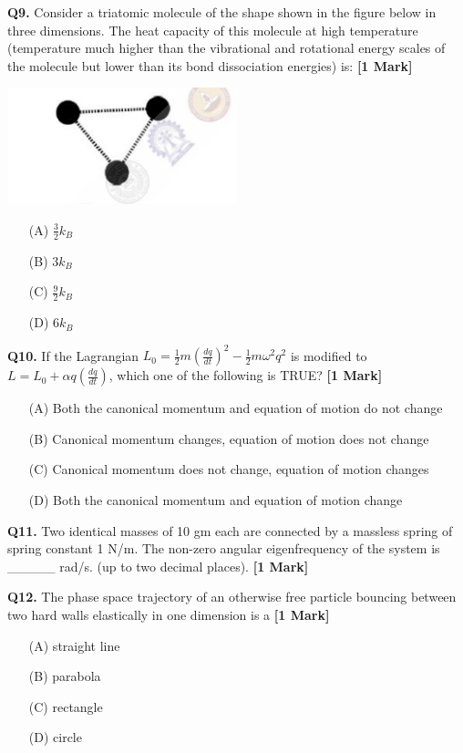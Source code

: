 \documentclass[11pt]{article}
\newcommand{\questiona}[2]{
    \noindent\textbf{Q#2.} #1 \hfill \textbf{[1 Mark]}
}
\begin{document}
\questiona{Consider a triatomic molecule of the shape shown in the figure below in three dimensions. The heat capacity of this molecule at high temperature (temperature much higher than the vibrational and rotational energy scales of the molecule but lower than its bond dissociation energies) is:}{9}
\begin{center}
\includegraphics[width=0.5\textwidth]{figures/9.png}
\end{center}
\begin{enumerate}
    \item[(A)] \(\frac{3}{2} k_B\)
    \item[(B)] \(3 k_B\)
    \item[(C)] \(\frac{9}{2} k_B\)
    \item[(D)] \(6 k_B\)
\end{enumerate}
\vspace{0.5cm}

\questiona{If the Lagrangian \( L_0 = \frac{1}{2} m \left( \frac{dq}{dt} \right)^2 - \frac{1}{2} m \omega^2 q^2 \) is modified to \( L = L_0 + \alpha q \left( \frac{dq}{dt} \right) \), which one of the following is TRUE?}{10}
\begin{enumerate}
    \item[(A)] Both the canonical momentum and equation of motion do not change
    \item[(B)] Canonical momentum changes, equation of motion does not change
    \item[(C)] Canonical momentum does not change, equation of motion changes
    \item[(D)] Both the canonical momentum and equation of motion change
\end{enumerate}
\vspace{0.5cm}

\questiona{Two identical masses of 10 gm each are connected by a massless spring of spring constant 1 N/m. The non-zero angular eigenfrequency of the system is \_\_\_\_\_ rad/s. (up to two decimal places).}{11}
\vspace{0.5cm}

\questiona{The phase space trajectory of an otherwise free particle bouncing between two hard walls elastically in one dimension is a}{12}
\begin{enumerate}
    \item[(A)] straight line
    \item[(B)] parabola
    \item[(C)] rectangle
    \item[(D)] circle
\end{enumerate}
\vspace{0.5cm}
\end{document}
